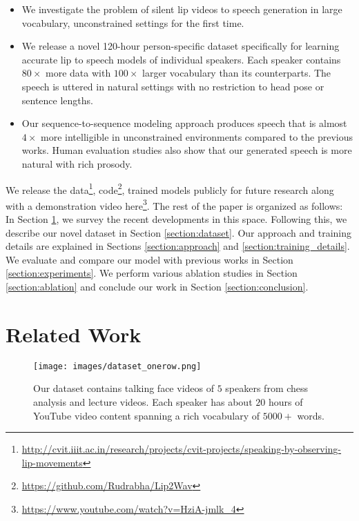 \documentclass[10pt,twocolumn,letterpaper]{article}
\begin{document}
\begin{itemize}
    \item We investigate the problem of silent lip videos to speech generation in large vocabulary, unconstrained settings for the first time.
    \item We release a novel 120-hour person-specific \modelname dataset specifically for learning accurate lip to speech models of individual speakers. Each speaker contains $80\times$ more data with $100\times$ larger vocabulary than its counterparts. The speech is uttered in natural settings with no restriction to head pose or sentence lengths.
    \item Our sequence-to-sequence modeling approach produces speech that is almost $4\times$ more intelligible in unconstrained environments compared to the previous works. Human evaluation studies also show that our generated speech is more natural with rich prosody.
\end{itemize}

We release the data\footnote{\url{http://cvit.iiit.ac.in/research/projects/cvit-projects/speaking-by-observing-lip-movements}}, code\footnote{\url{https://github.com/Rudrabha/Lip2Wav}}, trained models publicly for future research along with a demonstration video here\footnote{\url{https://www.youtube.com/watch?v=HziA-jmlk_4}}. The rest of the paper is organized as follows: In Section \ref{section:relatedwork}, we
survey the recent developments in this space. Following this, we describe our novel \modelname dataset in Section \ref{section:dataset}. Our approach and training details are explained in Sections \ref{section:approach} and \ref{section:training_details}. We evaluate and compare our model with previous works in Section \ref{section:experiments}. We perform various ablation studies in Section \ref{section:ablation} and conclude our work in Section \ref{section:conclusion}.

\section{Related Work}
\label{section:relatedwork}

\begin{figure*}[t]
  \texttt{[image: images/dataset\_onerow.png]}  \caption{Our \modelname dataset contains talking face videos of $5$ speakers from chess analysis and lecture videos. Each speaker has about $20$ hours of YouTube video content spanning a rich vocabulary of $5000+$ words.}
  \label{fig:dataset}
\end{figure*}
\end{document}
